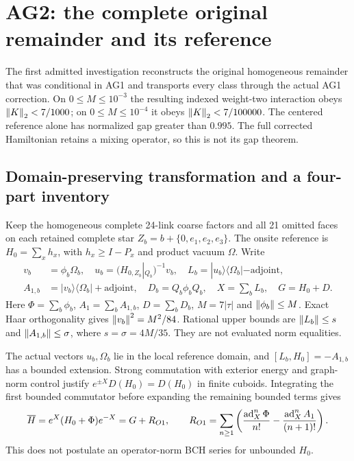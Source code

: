 \section{AG2: the complete original remainder and its reference\workstar}
The first admitted investigation reconstructs the original homogeneous remainder that was conditional in AG1 and transports every class through the actual AG1 correction. On $0\le M\le10^{-3}$ the resulting indexed weight-two interaction obeys $\left\lVert K\right\rVert_2<7/1000$; on $0\le M\le10^{-4}$ it obeys $\left\lVert K\right\rVert_2<7/100000$. The centered reference alone has normalized gap greater than $0.995$. The full corrected Hamiltonian retains a mixing operator, so this is not its gap theorem.

\subsection{Domain-preserving transformation and a four-part inventory}
Keep the homogeneous complete 24-link coarse factors and all 21 omitted faces on each retained complete star $Z_b=b+\{0,e_1,e_2,e_3\}$. The onsite reference is $H_0=\sum_xh_x$, with $h_x\ge I-P_x$ and product vacuum $\Omega$. Write
\begin{align}
v_b&=\phi_b\Omega_b,\quad u_b=(H_{0,Z_b}|_{Q_b})^{-1}v_b,\quad
L_b=|u_b\rangle\langle\Omega_b|-\mathrm{adjoint},\nonumber\\
A_{1,b}&=|v_b\rangle\langle\Omega_b|+\mathrm{adjoint},\quad
D_b=Q_b\phi_bQ_b,\quad X=\sum_bL_b,\quad G=H_0+D.
\label{ag2:linear}
\end{align}
Here $\Phi=\sum_b\phi_b$, $A_1=\sum_bA_{1,b}$, $D=\sum_bD_b$, $M=7|\tau|$ and $\left\lVert\phi_b\right\rVert\le M$. Exact Haar orthogonality gives $\left\lVert v_b\right\rVert^2=M^2/84$. Rational upper bounds are $\left\lVert L_b\right\rVert\le s$ and $\left\lVert A_{1,b}\right\rVert\le\sigma$, where $s=\sigma=4M/35$. They are not evaluated norm equalities.

The actual vectors $u_b,\Omega_b$ lie in the local reference domain, and $[L_b,H_0]=-A_{1,b}$ has a bounded extension. Strong commutation with exterior energy and graph-norm control justify $e^{\pm X}D(H_0)=D(H_0)$ in finite cuboids. Integrating the first bounded commutator before expanding the remaining bounded terms gives
\begin{equation}
\overline H=e^X(H_0+\Phi)e^{-X}=G+R_{O1},\qquad
R_{O1}=\sum_{n\ge1}\left(\frac{\operatorname{ad}_X^n\Phi}{n!}-\frac{\operatorname{ad}_X^nA_1}{(n+1)!}\right).
\label{ag2:original}
\end{equation}
This does not postulate an operator-norm BCH series for unbounded $H_0$.

